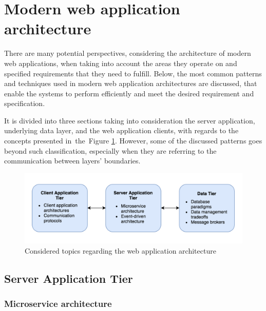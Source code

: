 \section{Modern web application architecture} \label{section:web-apps-modern-web-application-architecture}

There are many potential perspectives, considering the architecture of modern web applications, when taking into account the areas they operate on and specified requirements that they need to fulfill. Below, the most common patterns and techniques used in modern web application architectures are discussed, that enable the systems to perform efficiently and meet the desired requirement and specification. 

It is divided into three sections taking into consideration the server application, underlying data layer, and the web application clients, with regards to the concepts presented in~the~Figure \ref{fig:web-app-architecture-concepts}. However, some of the discussed patterns goes beyond such classification, especially when they are referring to the communication between layers' boundaries.

\begin{figure}[h]
    \centering
    \includegraphics[width=1\textwidth]{assets/03-web-applications/WebAppLayers.png}
    \caption{Considered topics regarding the web application architecture}
    \label{fig:web-app-architecture-concepts}
\end{figure}

\subsection{Server Application Tier}

\subsubsection{Microservice architecture} \label{section:web-apps-microservices}

